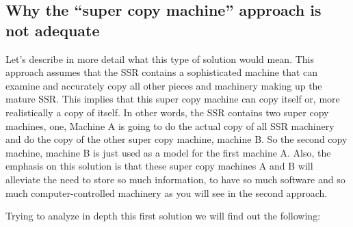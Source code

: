 \documentclass[letterpaper]{article}
\begin{document}
\bigskip

\subsection[Why the “super copy machine” approach is not adequate]{Why
the “super copy machine” approach is not adequate}
\hypertarget{RefHeading3120306210128}{}Let’s describe in more detail
what this type of solution would mean. This approach assumes that the
SSR contains a sophisticated machine that can examine and accurately
copy all other pieces and machinery making up the mature SSR. This
implies that this super copy machine can copy itself or, more
realistically a copy of itself. In other words, the SSR contains two
super copy machines, one, Machine A is going to do the actual copy of
all SSR machinery and do the copy of the other super copy machine,
machine B. So the second copy machine, machine B is just used as a
model for the first machine A. Also, the emphasis on this solution is
that these super copy machines A and B will alleviate the need to store
so much information, to have so much software and so much
computer-controlled machinery as you will see in the second approach.


\bigskip

Trying to analyze in depth this first solution we will find out the
following:


\bigskip
\end{document}
